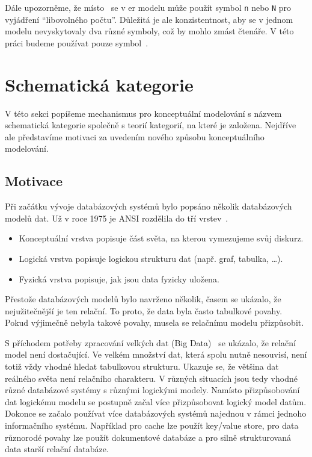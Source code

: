 Dále upozorněme, že místo~\many{} se v \acrshort{er} modelu může použít symbol \texttt{n} nebo \texttt{N} pro vyjádření \enquote{libovolného počtu}.
Důležitá je ale konzistentnost, aby se v jednom modelu nevyskytovaly dva různé symboly, což by mohlo zmást čtenáře.
V této práci budeme používat pouze symbol~\many{}.

\section{Schematická kategorie}\label{section:schemcat}

V této sekci popíšeme mechanismus pro konceptuální modelování s názvem schematická kategorie společně s teorií kategorií, na které je založena.
Nejdříve ale představíme motivaci za uvedením nového způsobu konceptuálního modelování.

\subsection{Motivace}

Při začátku vývoje databázových systémů bylo popsáno několik databázových modelů dat.
Už v roce 1975 je ANSI rozdělila do tří vrstev~\cite{steeljr._interimreport_1975}.
\begin{itemize}
  \item Konceptuální vrstva popisuje část světa, na kterou vymezujeme svůj diskurz.
  \item Logická vrstva popisuje logickou strukturu dat (např. graf, tabulka, \dots).
  \item Fyzická vrstva popisuje, jak jsou data fyzicky uložena.
\end{itemize}

Přestože databázových modelů bylo navrženo několik, časem se ukázalo, že nejužitečnější je ten relační.
To proto, že data byla často tabulkové povahy.
Pokud výjimečně nebyla takové povahy, musela se relačnímu modelu přizpůsobit.

S příchodem potřeby zpracování velkých dat (Big Data)~\cite{cron_bigdata_2012} se ukázalo, že relační model není dostačující.
Ve velkém množství dat, která spolu nutně nesouvisí, není totiž vždy vhodné hledat tabulkovou strukturu.
Ukazuje se, že většina dat reálného světa není relačního charakteru.
V různých situacích jsou tedy vhodné různé databázové systémy s různými logickými modely.
Namísto přizpůsobování dat logickému modelu se postupně začal více přizpůsobovat logický model datům.
Dokonce se začalo používat více databázových systémů najednou v rámci jednoho informačního systému.
Například pro cache lze použít key/value store, pro data různorodé povahy lze použít dokumentové databáze a pro silně strukturovaná data starší relační databáze.

